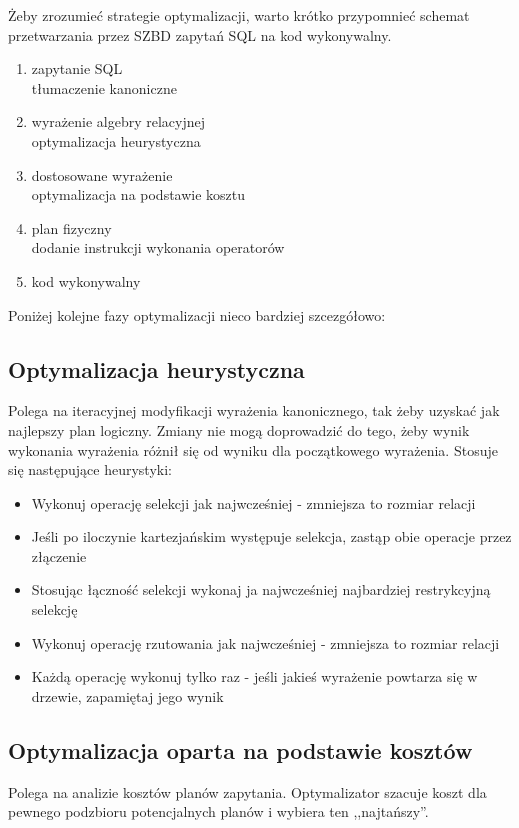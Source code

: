 Żeby zrozumieć strategie optymalizacji, warto krótko przypomnieć schemat przetwarzania przez SZBD zapytań SQL na kod wykonywalny.
\begin{enumerate}
    \item zapytanie SQL \\
    \downarrow tłumaczenie kanoniczne
    \item wyrażenie algebry relacyjnej \\
    \downarrow optymalizacja heurystyczna
    \item dostosowane wyrażenie \\
    \downarrow optymalizacja na podstawie kosztu
    \item plan fizyczny \\
    \downarrow dodanie instrukcji wykonania operatorów
    \item kod wykonywalny
\end{enumerate}

Poniżej kolejne fazy optymalizacji nieco bardziej szcezgółowo:
\subsection*{Optymalizacja heurystyczna}
Polega na iteracyjnej modyfikacji wyrażenia kanonicznego, tak żeby uzyskać jak najlepszy plan logiczny. Zmiany nie mogą doprowadzić do tego, żeby wynik wykonania wyrażenia różnił się od wyniku dla początkowego wyrażenia.
Stosuje się następujące heurystyki:
\begin{itemize}
    \item Wykonuj operację selekcji jak najwcześniej - zmniejsza to rozmiar relacji
    \item Jeśli po iloczynie kartezjańskim występuje selekcja, zastąp obie operacje przez złączenie
    \item Stosując łączność selekcji wykonaj ja najwcześniej najbardziej restrykcyjną selekcję
    \item Wykonuj operację rzutowania jak najwcześniej - zmniejsza to rozmiar relacji
    \item Każdą operację wykonuj tylko raz - jeśli jakieś wyrażenie powtarza się w drzewie, zapamiętaj jego wynik
\end{itemize}

\subsection*{Optymalizacja oparta na podstawie kosztów}
Polega na analizie kosztów planów zapytania. Optymalizator szacuje koszt dla pewnego
podzbioru potencjalnych planów i wybiera ten ,,najtańszy''.

